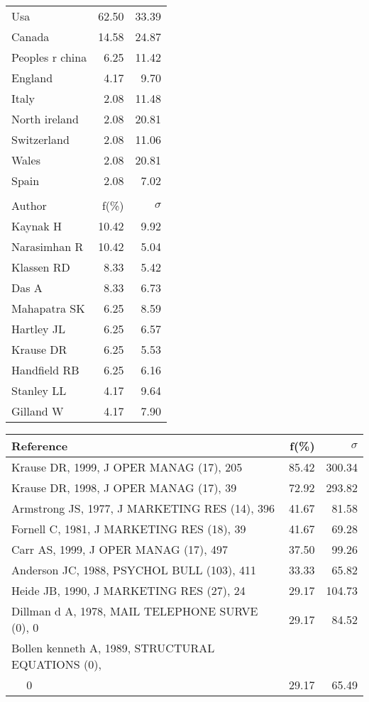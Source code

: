 \documentclass[a4paper,11pt]{report}
\begin{document}
\begin{landscape}
\begin{table}[!ht]
{\begin{tabular}{|l r r|}
\hline
Usa & 62.50 & 33.39\\
Canada & 14.58 & 24.87\\
Peoples r china & 6.25 & 11.42\\
England & 4.17 & 9.70\\
Italy & 2.08 & 11.48\\
North ireland & 2.08 & 20.81\\
Switzerland & 2.08 & 11.06\\
Wales & 2.08 & 20.81\\
Spain & 2.08 & 7.02\\
 &  & \\
\hline
\hline
Author & f(\%) & $\sigma$\\
\hline
Kaynak H & 10.42 & 9.92\\
Narasimhan R & 10.42 & 5.04\\
Klassen RD & 8.33 & 5.42\\
Das A & 8.33 & 6.73\\
Mahapatra SK & 6.25 & 8.59\\
Hartley JL & 6.25 & 6.57\\
Krause DR & 6.25 & 5.53\\
Handfield RB & 6.25 & 6.16\\
Stanley LL & 4.17 & 9.64\\
Gilland W & 4.17 & 7.90\\
\hline
\end{tabular}
}
{\scriptsize\begin{tabular}{|l r r|}
\hline
Reference & f(\%) & $\sigma$\\
\hline
Krause DR, 1999, J OPER MANAG (17), 205 & 85.42 & 300.34\\
Krause DR, 1998, J OPER MANAG (17), 39 & 72.92 & 293.82\\
Armstrong JS, 1977, J MARKETING RES (14), 396 & 41.67 & 81.58\\
Fornell C, 1981, J MARKETING RES (18), 39 & 41.67 & 69.28\\
Carr AS, 1999, J OPER MANAG (17), 497 & 37.50 & 99.26\\
Anderson JC, 1988, PSYCHOL BULL (103), 411 & 33.33 & 65.82\\
Heide JB, 1990, J MARKETING RES (27), 24 & 29.17 & 104.73\\
Dillman d A, 1978, MAIL TELEPHONE SURVE (0), 0 & 29.17 & 84.52\\
Bollen kenneth A, 1989, STRUCTURAL EQUATIONS (0), &  & \\
$\quad$ 0 & 29.17 & 65.49\\

\end{tabular}}
\end{table}
\end{landscape}
\end{document}
